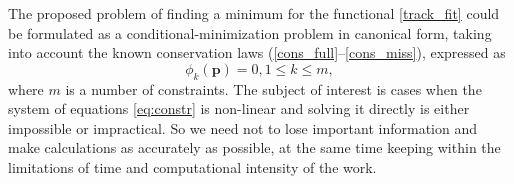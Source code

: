 %

The proposed problem of finding a minimum for the functional \eqref{track_fit} could be formulated as a conditional-minimization problem in canonical form, taking into account the known conservation laws (\ref{cons_full}--\ref{cons_miss}), expressed as
\begin{equation}
\label{eq:constr}
\phi_k(\boldsymbol{p}) = 0, 1 \leqslant k  \leqslant m,
\end{equation}
where $m$ is a number of constraints.
The subject of interest is cases when the system of equations \eqref{eq:constr} is non-linear and solving it directly is either impossible or impractical. %
So we need not to lose important information and make calculations as accurately as possible, at the same time keeping within the limitations of time and computational intensity of the work.
